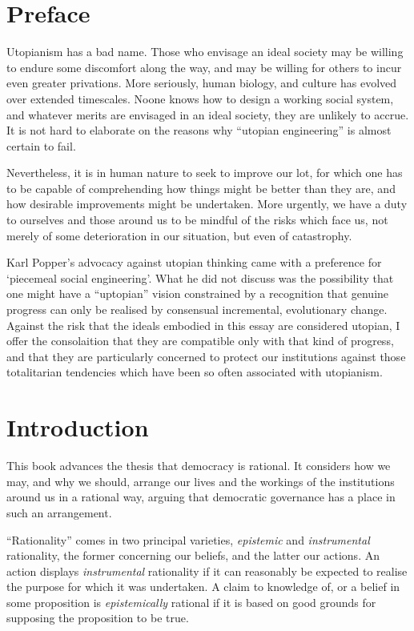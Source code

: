 \mainmatter

\chapter*{Preface}


Utopianism has a bad name.
Those who envisage an ideal society may be willing to endure some discomfort along the way, and may be willing for others to incur even greater privations.
More seriously, human biology, and culture has evolved over extended timescales.
Noone knows how to design a working social system, and whatever merits are envisaged in an ideal society, they are unlikely to accrue.
It is not hard to elaborate on the reasons why ``utopian engineering'' is almost certain to fail.

Nevertheless, it is in human nature to seek to improve our lot, for which one has to be capable of comprehending how things might be better than they are, and how desirable improvements might be undertaken.
More urgently, we have a duty to ourselves and those around us to be mindful of the risks which face us, not merely of some deterioration in our situation, but even of catastrophy.

Karl Popper's advocacy against utopian thinking came with a preference for `piecemeal social engineering'.
What he did not discuss was the possibility that one might have a ``uptopian'' vision constrained by a recognition that genuine progress can only be realised by consensual incremental, evolutionary change.
Against the risk that the ideals embodied in this essay are considered utopian, I offer the consolaition that they are compatible only with that kind of progress, and that they are particularly concerned to protect our institutions against those totalitarian tendencies which have been so often associated with utopianism.

\chapter{Introduction}

This book advances the thesis that democracy is rational.
It considers how we may, and why we should, arrange our lives and the workings of the institutions around us in a rational way, arguing that democratic governance has a place in such an arrangement.

``Rationality'' comes in two principal varieties, \emph{epistemic} and \emph{instrumental} rationality, the former concerning our beliefs, and the latter our actions.
An action displays \emph{instrumental} rationality if it can reasonably be expected to realise the purpose for which it was undertaken.
A claim to knowledge of, or a belief in some proposition is \emph{epistemically} rational if it is based on good grounds for supposing the proposition to be true.

